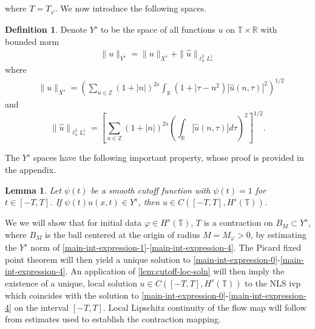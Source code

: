 \documentclass[12pt,reqno]{amsart}
\numberwithin{equation}{section}  %
\numberwithin{figure}{section}
\newcommand{\rr}{\mathbb{R}}
\newcommand{\zz}{\mathbb{Z}}
\newcommand{\ci}{\mathbb{T}}
\newcommand{\wh}{\widehat}
\newcommand{\vp}{\varphi}
\theoremstyle{plain}
\newtheorem{lemma}{Lemma}
\theoremstyle{definition}
\newtheorem{definition}{Definition}
\theoremstyle{remark}
\begin{document}
%
%
where $T = T_{\vp}$. We now introduce the following spaces.
\begin{definition}
	Denote $Y^s$ to be the space of all
	functions $u$ on $\ci \times \rr$ with
	bounded norm
\begin{equation}
	\label{Y-s-norm}
	\begin{split}
		\|u\|_{Y^s} = \|u\|_{X^s} + \|\wh{u}\|_{ \ell^2_n L^1_\tau }
	\end{split}
\end{equation}
%
%
%
%
where
%
\begin{equation}
	\label{X^s-norm}
	\begin{split}
		& \|u\|_{X^s}
		= \left ( \sum_{n\in \zz} \left (1 + |n| \right )^{2s} \int_\rr \left ( 1 + | 
		\tau - n^2 \right ) | \wh{u} ( n, \tau ) |^2
		\right )^{1/2}
	\end{split}
\end{equation}
and
%
%
\begin{equation}
	\label{E-norm}
	\|\wh{u}\|_{ \ell^2_n L^1_\tau } = \left[ \sum_{n \in \zz}(1 + | n |)^{2s} \left(
	\int_{\rr}| \wh{u}(n, \tau) |d \tau \right)^{2} \right]^{1/2}.
\end{equation}
%
%
%
%
\end{definition}
The $Y^s$ spaces have the following important property, whose proof
is provided in the appendix.
\begin{lemma}
	\label{lem:cutoff-loc-soln}
	Let $\psi(t)$ be a smooth cutoff function with $\psi(t) =1$ for $t \in [-T, T]$. If
	$\psi(t)u(x,t) \in Y^s$, then $u \in C([-T, T], H^s(\ci))$.
\end{lemma}
%
%
We we will 
show that for initial data $\vp \in H^s(\ci)$, $T$ is a contraction on $B_M 
\subset Y^s$, where $B_M$ is the ball centered at the origin of radius $M = 
M_{\vp}> 0$, by estimating the $Y^s$
norm of \eqref{main-int-expression-1}-\eqref{main-int-expression-4}. The 
Picard fixed point theorem will
then yield a unique solution to
\eqref{main-int-expression-0}-\eqref{main-int-expression-4}. An application of
\autoref{lem:cutoff-loc-soln} will then imply the existence of a unique, local
solution $u \in C([-T, T], H^s(\ci))$ to the NLS ivp which coincides with the solution to
\eqref{main-int-expression-0}-\eqref{main-int-expression-4} on the interval $[-T, T]$. Local Lipschitz continuity of the flow map will follow
from estimates used to establish the contraction mapping. %
%
%
%
%
%
%
%
\end{document}

